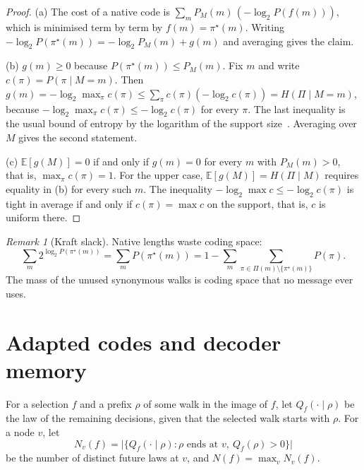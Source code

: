 \documentclass[11pt]{article}
\theoremstyle{definition}
\theoremstyle{remark}
\newtheorem{remark}{Remark}
\newcommand{\Pset}{\Pi}
\newcommand{\E}{\mathbb{E}}
\begin{document}
\begin{proof}
(a) The cost of a native code is $\sum_m P_M(m)\,(-\log_2 P(f(m)))$, which is minimised term by term by $f(m)=\pi^\star(m)$. Writing $-\log_2 P(\pi^\star(m))=-\log_2 P_M(m)+g(m)$ and averaging gives the claim.

(b) $g(m)\ge0$ because $P(\pi^\star(m))\le P_M(m)$. Fix $m$ and write $c(\pi)=P(\pi\mid M=m)$. Then $g(m)=-\log_2\max_\pi c(\pi)\le\sum_\pi c(\pi)(-\log_2 c(\pi))=H(\Pi\mid M=m)$, because $-\log_2\max_\pi c(\pi)\le-\log_2 c(\pi)$ for every $\pi$. The last inequality is the usual bound of entropy by the logarithm of the support size~\cite{cover2006}. Averaging over $M$ gives the second statement.

(c) $\E[g(M)]=0$ if and only if $g(m)=0$ for every $m$ with $P_M(m)>0$, that is, $\max_\pi c(\pi)=1$. For the upper case, $\E[g(M)]=H(\Pi\mid M)$ requires equality in (b) for every such $m$. The inequality $-\log_2\max c\le-\log_2 c(\pi)$ is tight in average if and only if $c(\pi)=\max c$ on the support, that is, $c$ is uniform there.
\end{proof}

\begin{remark}[Kraft slack]
Native lengths waste coding space:
\[
\sum_m 2^{\log_2P(\pi^\star(m))}=\sum_mP(\pi^\star(m))=1-\sum_m\sum_{\pi\in\Pset(m)\setminus\{\pi^\star(m)\}}P(\pi).
\] The mass of the unused synonymous walks is coding space that no message ever uses.
\end{remark}

\section{Adapted codes and decoder memory}

For a selection $f$ and a prefix $\rho$ of some walk in the image of $f$, let $Q_f(\cdot\mid\rho)$ be the law of the remaining decisions, given that the selected walk starts with $\rho$. For a node $v$, let
\[
N_v(f)=\bigl|\{Q_f(\cdot\mid\rho):\rho\text{ ends at }v,\ Q_f(\rho)>0\}\bigr|
\]
be the number of distinct future laws at $v$, and $N(f)=\max_vN_v(f)$.
\end{document}
